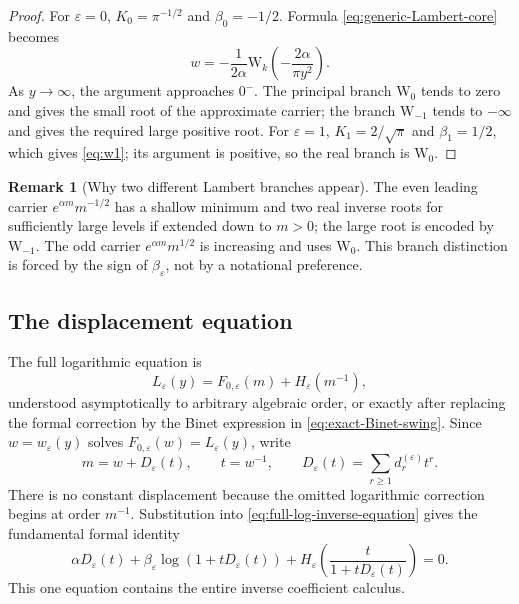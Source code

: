 \documentclass[11pt,a4paper]{article}
\theoremstyle{clean}
\theoremstyle{definition}
\newtheorem{remark}[theorem]{Remark}
\newcommand{\eps}{\varepsilon}
\newcommand{\al}{\alpha}
\newcommand{\be}{\beta}
\newcommand{\W}{\mathrm W}
\begin{document}
\begin{proof}
For \(\eps=0\), \(K_0=\pi^{-1/2}\) and \(\be_0=-1/2\).  Formula \cref{eq:generic-Lambert-core} becomes
\[
 w=-\frac1{2\al}\W_k\!\left(-\frac{2\al}{\pi y^2}\right).
\]
As \(y\to\infty\), the argument approaches \(0^-\).  The principal branch \(\W_0\) tends to zero and gives the small root of the approximate carrier; the branch \(\W_{-1}\) tends to \(-\infty\) and gives the required large positive root.  For \(\eps=1\), \(K_1=2/\sqrt\pi\) and \(\be_1=1/2\), which gives \cref{eq:w1}; its argument is positive, so the real branch is \(\W_0\).
\end{proof}

\begin{remark}[Why two different Lambert branches appear]
The even leading carrier \(e^{\al m}m^{-1/2}\) has a shallow minimum and two real inverse roots for sufficiently large levels if extended down to \(m>0\); the large root is encoded by \(\W_{-1}\).  The odd carrier \(e^{\al m}m^{1/2}\) is increasing and uses \(\W_0\).  This branch distinction is forced by the sign of \(\be_\eps\), not by a notational preference.
\end{remark}

\subsection{The displacement equation}

The full logarithmic equation is
\begin{equation}
 L_\eps(y)=F_{0,\eps}(m)+H_\eps(m^{-1}),
 \label{eq:full-log-inverse-equation}
\end{equation}
understood asymptotically to arbitrary algebraic order, or exactly after replacing the formal correction by the Binet expression in \cref{eq:exact-Binet-swing}.  Since \(w=w_\eps(y)\) solves \(F_{0,\eps}(w)=L_\eps(y)\), write
\begin{equation}
 m=w+D_\eps(t),\qquad t=w^{-1},
 \qquad D_\eps(t)=\sum_{r\ge1}d_r^{(\eps)}t^r.
 \label{eq:D-def}
\end{equation}
There is no constant displacement because the omitted logarithmic correction begins at order \(m^{-1}\).  Substitution into \cref{eq:full-log-inverse-equation} gives the fundamental formal identity
\begin{equation}
 \boxed{\displaystyle
 \al D_\eps(t)
 +\be_\eps\log\!\left(1+tD_\eps(t)\right)
 +H_\eps\!\left(\frac{t}{1+tD_\eps(t)}\right)=0.}
 \label{eq:fundamental-D}
\end{equation}
This one equation contains the entire inverse coefficient calculus.
\end{document}
